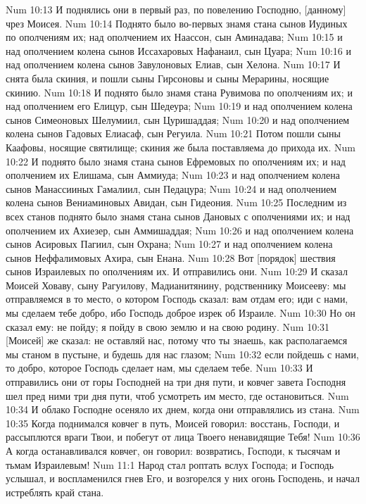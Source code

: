 Num 10:13  И поднялись они в первый раз, по повелению Господню, [данному] чрез Моисея.
Num 10:14  Поднято было во-первых знамя стана сынов Иудиных по ополчениям их; над ополчением их Наассон, сын Аминадава;
Num 10:15  и над ополчением колена сынов Иссахаровых Нафанаил, сын Цуара;
Num 10:16  и над ополчением колена сынов Завулоновых Елиав, сын Хелона.
Num 10:17  И снята была скиния, и пошли сыны Гирсоновы и сыны Мерарины, носящие скинию.
Num 10:18  И поднято было знамя стана Рувимова по ополчениям их; и над ополчением его Елицур, сын Шедеура;
Num 10:19  и над ополчением колена сынов Симеоновых Шелумиил, сын Цуришаддая;
Num 10:20  и над ополчением колена сынов Гадовых Елиасаф, сын Регуила.
Num 10:21  Потом пошли сыны Каафовы, носящие святилище; скиния же была поставляема до прихода их.
Num 10:22  И поднято было знамя стана сынов Ефремовых по ополчениям их; и над ополчением их Елишама, сын Аммиуда;
Num 10:23  и над ополчением колена сынов Манассииных Гамалиил, сын Педацура;
Num 10:24  и над ополчением колена сынов Вениаминовых Авидан, сын Гидеония.
Num 10:25  Последним из всех станов поднято было знамя стана сынов Дановых с ополчениями их; и над ополчением их Ахиезер, сын Аммишаддая;
Num 10:26  и над ополчением колена сынов Асировых Пагиил, сын Охрана;
Num 10:27  и над ополчением колена сынов Неффалимовых Ахира, сын Енана.
Num 10:28  Вот [порядок] шествия сынов Израилевых по ополчениям их. И отправились они.
Num 10:29  И сказал Моисей Ховаву, сыну Рагуилову, Мадианитянину, родственнику Моисееву: мы отправляемся в то место, о котором Господь сказал: вам отдам его; иди с нами, мы сделаем тебе добро, ибо Господь доброе изрек об Израиле.
Num 10:30  Но он сказал ему: не пойду; я пойду в свою землю и на свою родину.
Num 10:31  [Моисей] же сказал: не оставляй нас, потому что ты знаешь, как располагаемся мы станом в пустыне, и будешь для нас глазом;
Num 10:32  если пойдешь с нами, то добро, которое Господь сделает нам, мы сделаем тебе.
Num 10:33  И отправились они от горы Господней на три дня пути, и ковчег завета Господня шел пред ними три дня пути, чтоб усмотреть им место, где остановиться.
Num 10:34  И облако Господне осеняло их днем, когда они отправлялись из стана.
Num 10:35  Когда поднимался ковчег в путь, Моисей говорил: восстань, Господи, и рассыплются враги Твои, и побегут от лица Твоего ненавидящие Тебя!
Num 10:36  А когда останавливался ковчег, он говорил: возвратись, Господи, к тысячам и тьмам Израилевым!
Num 11:1  Народ стал роптать вслух Господа; и Господь услышал, и воспламенился гнев Его, и возгорелся у них огонь Господень, и начал истреблять край стана.
